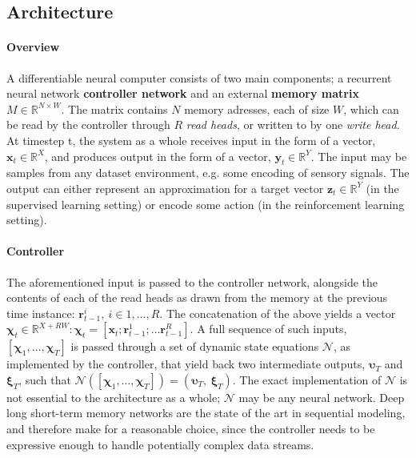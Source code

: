 \documentclass[]{article}
\begin{document}
\subsection{Architecture}
\paragraph{Overview} 
A differentiable neural computer consists of two main components; a recurrent neural network \textbf{controller network} and an external \textbf{memory matrix} $M \in \mathbb{R}^{N\times W}$. The matrix contains $N$ memory adresses, each of size $W$, which can be read by the controller through $R$ \textit{read heads}, or written to by one \textit{write head}. At timestep t, the system as a whole receives input in the form of a vector, $\pmb{x}_t \in \mathbb{R}^X$, and produces output in the form of a vector, $\pmb{y}_t \in \mathbb{R}^Y$. The input may be samples from any dataset environment, e.g. some encoding of sensory signals. The output can either represent an approximation for a target vector $\pmb{z}_t \in \mathbb{R}^Y$ (in the supervised learning setting) or encode some action (in the reinforcement learning setting).
\paragraph{Controller}
The aforementioned input is passed to the controller network, alongside the contents of each of the read heads as drawn from the memory at the previous time instance: $\pmb{r}_{t-1}^{i},\ i \in 1, \dots ,R$. The concatenation of the above yields a vector $\pmb{\chi}_t \in \mathbb{R}^{X + RW}: \pmb{\chi}_t = [\pmb{x}_t; \pmb{r}_{t-1}^1; \dots \pmb{r}_{t-1}^R ] $. A full sequence of such inputs, $[\pmb{\chi}_1,\dots ,\pmb{\chi}_T]$ is passed through a set of dynamic state equations $\mathcal{N}$, as implemented by the controller, that yield back two intermediate outputs, $\pmb{\upsilon }_T$ and $\pmb{\xi}_T$, such that $\mathcal{N}([\pmb{\chi}_1,\dots,\pmb{\chi}_T]) = (\pmb{\upsilon}_T,\ \pmb{\xi}_T)$. The exact implementation of $\mathcal{N}$ is not essential to the architecture as a whole; $\mathcal{N}$ may be any neural network. Deep long short-term memory networks are the state of the art in sequential modeling, and therefore make for a reasonable choice, since the controller needs to be expressive enough to handle potentially complex data streams.
\end{document}
